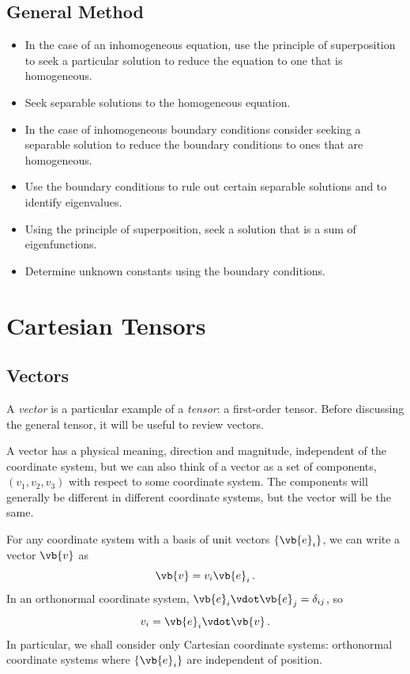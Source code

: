 \documentclass{article}
\theoremstyle{plain}\theoremheaderfont{\normalfont\itshape}\theorembodyfont{\rmfamily}\theoremseparator{.}\newtheorem*{rem}{Remark}\newtheorem*{ex}{Example}\newtheorem*{proof}{Proof}\newtheorem*{altp}{Alternative proof}
\theoremstyle{plain}\theoremheaderfont{\normalfont\bfseries}\theorembodyfont{\rmfamily}\theoremseparator{.}\newtheorem{thm}{Theorem}[section]\newtheorem{lem}[thm]{Lemma}\newtheorem{prop}[thm]{Proposition}\newtheorem*{cor}{Corollary}\newtheorem{defn}[thm]{Definition}\newtheorem{clm}[thm]{Claim}\newtheorem{clminproof}{Claim}
\theoremstyle{break}\theoremheaderfont{\normalfont\itshape}\theorembodyfont{\rmfamily}\theoremseparator{.\medskip}\newtheorem*{proofskip}{Proof}\newtheorem*{exs}{Examples}\newtheorem*{rems}{Remarks}
\theoremstyle{break}\theoremheaderfont{\normalfont\bfseries}\theorembodyfont{\rmfamily}\theoremseparator{.\medskip}\newtheorem{lemskip}[thm]{Lemma}\newtheorem{defnskip}[thm]{Definition}\newtheorem{propskip}[thm]{Proposition}\newtheorem{thmskip}[thm]{Theorem}
\numberwithin{equation}{section}
\begin{document}
	\subsection{General Method}
	\begin{itemize}[topsep=0pt,leftmargin=50pt]
		\item In the case of an inhomogeneous equation, use the principle of superposition to seek a particular solution to reduce the equation to one that is homogeneous.
		\item Seek separable solutions to the homogeneous equation.
		\item In the case of inhomogeneous boundary conditions consider seeking a separable solution to reduce the boundary conditions to ones that are homogeneous.
		\item Use the boundary conditions to rule out certain separable solutions and to identify eigenvalues.
		\item Using the principle of superposition, seek a solution that is a sum of eigenfunctions.
		\item Determine unknown constants using the boundary conditions.
	\end{itemize}
	
	\newpage

	\section{Cartesian Tensors}
	\subsection{Vectors}
	A \textit{vector} is a particular example of a \textit{tensor}: a first-order tensor. Before discussing the general tensor, it will be useful to review vectors.

	A vector has a physical meaning, direction and magnitude, independent of the coordinate system, but we can also think of a vector as a set of components, \((v_1,v_2,v_3)\) with respect to some coordinate system. The components will generally be different in different coordinate systems, but the vector will be the same.

	For any coordinate system with a basis of unit vectors \(\{\vb{e}_i\}\), we can write a vector \(\vb{v}\) as
	\[\vb{v}=v_i\vb{e}_i\,.\]
	In an orthonormal coordinate system, \(\vb{e}_i\vdot\vb{e}_j=\delta_{ij}\), so
	\[v_i=\vb{e}_i\vdot\vb{v}\,.\]
	In particular, we shall consider only Cartesian coordinate systems: orthonormal coordinate systems where \(\{\vb{e}_i\}\) are independent of position.
\end{document}
